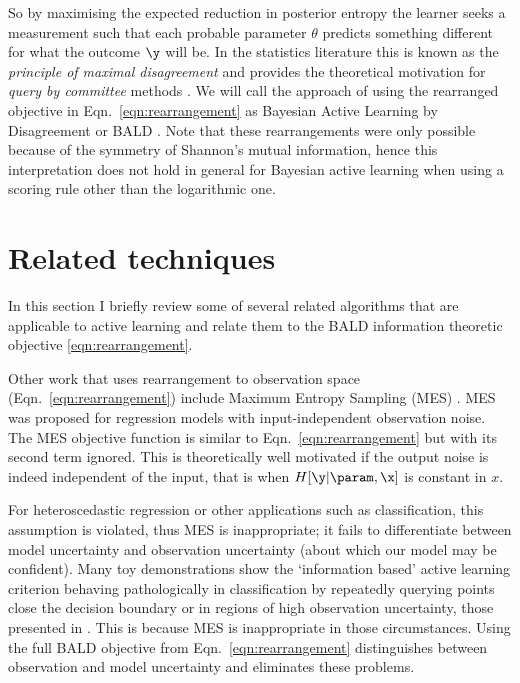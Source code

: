 So by maximising the expected reduction in posterior entropy the learner seeks a measurement such that each probable parameter $\theta$ predicts something different for what the outcome $\y$ will be. In the statistics literature this is known as the \emph{principle of maximal disagreement} and provides the theoretical motivation for \emph{query by committee} methods \citep{Freund1997}. We will call the approach of using the rearranged objective in Eqn.\ \eqref{eqn:rearrangement} as Bayesian Active Learning by Disagreement or BALD \citep{Houlsby2011,Houlsby2012preference,Huszar2012quantum}. Note that these rearrangements were only possible because of the symmetry of Shannon's mutual information, hence this interpretation does not hold in general for Bayesian active learning when using a scoring rule other than the logarithmic one.

\section{Related techniques}

In this section I briefly review some of several related algorithms that are applicable to active learning and relate them to the BALD information theoretic objective \eqref{eqn:rearrangement}.

Other work that uses rearrangement to observation space (Eqn.\ \eqref{eqn:rearrangement}) include Maximum Entropy Sampling (MES) \citep{sebastiani2000}. MES was proposed for regression models with input-independent observation noise. The MES objective function is similar to Eqn.\ \eqref{eqn:rearrangement} but with its second term ignored. This is theoretically well motivated if the output noise is indeed independent of the input, that is when $H[\y\vert\param,\x]$ is constant in $x$.

For heteroscedastic regression or other applications such as classification, this assumption is violated, thus MES is inappropriate; it fails to differentiate between model uncertainty and observation uncertainty (about which our model may be confident). Many toy demonstrations show the `information based' active learning criterion behaving pathologically in classification by repeatedly querying points close the decision boundary or in regions of high observation uncertainty, \eg those presented in \citep{dasgupta2008, huang2010}. This is because MES is inappropriate in those circumstances. Using the full BALD objective from Eqn.\ \eqref{eqn:rearrangement} distinguishes between observation and model uncertainty and eliminates these problems.

